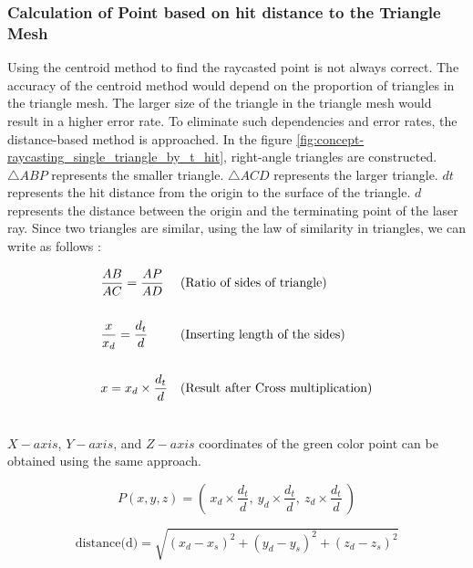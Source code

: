\subsubsection{Calculation of Point based on hit distance to the Triangle Mesh}
Using the centroid method to find the raycasted point is not always correct. The accuracy of the centroid method would depend on the proportion of triangles in the triangle mesh. The larger size of the triangle in the triangle mesh would result in a higher error rate. To eliminate such dependencies and error rates, the distance-based method is approached.  
In the figure \ref{fig:concept-raycasting_single_triangle_by_t_hit}, right-angle triangles are constructed. $\triangle ABP$ represents the smaller triangle. $\triangle ACD$ represents the larger triangle. \(dt\) represents the hit distance from the origin to the surface of the triangle. \(d\) represents the distance between the origin and the terminating point of the laser ray. Since two triangles are similar, using the law of similarity in triangles, we can write as follows : 

\begin{gather*}
\begin{aligned}
&\frac{AB}{AC} = \frac{AP}{AD} && \text{(Ratio of sides of triangle)}\hfill \\ \\
&\frac{x}{x_d} = \frac{d_t}{d} && \text{(Inserting length of the sides)}\hfill \\  \\
&x = x_d \times \frac{d_t}{d} && \text{(Result after Cross multiplication)}\hfill  \\  \\
\end{aligned}
\end{gather*}

\(X-axis\), \(Y-axis\), and \(Z-axis\) coordinates of the green color point can be obtained using the same approach.

\begin{equation}\label{eq:find_xyz}
    P(x, y, z) = \left( \: x_d \times \frac{d_t}{d}, \: y_d \times \frac{d_t}{d}, \: z_d \times \frac{d_t}{d} \: \right)
\end{equation}

\begin{equation}\label{eq:distance}
\text{distance(d)} = \sqrt{{(x_d - x_s)}^2 + {(y_d - y_s)}^2 + {(z_d - z_s)}^2}
\end{equation}

